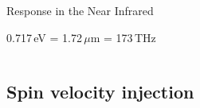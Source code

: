 \documentclass{beamer}
\begin{document}
\begin{frame}
\begin{columns}
\begin{center}
\begin{figure}[h!]
\begin{tikzpicture}
\end{tikzpicture}
\end{figure}

\vspace{-3mm}

Response in the Near Infrared

0.717\,eV = 1.72\,$\mu$m = 173\,THz

\end{center}

\end{columns}

\end{frame}



\subsection{Spin velocity injection}


\end{document}

